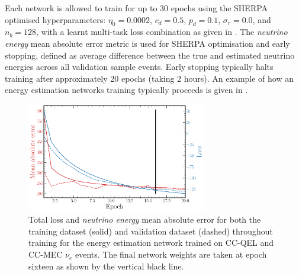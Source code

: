 Each network is allowed to train for up to 30 epochs using the SHERPA optimised hyperparameters:
$\eta_{0}=0.0002$, $c_{d}=0.5$, $p_{d}=0.1$, $\sigma_{r}=0.0$, and $n_{b}=128$, with a learnt
multi-task loss combination as given in . The \emph{neutrino energy}
mean absolute error metric is used for SHERPA optimisation and early stopping, defined as average
difference between the true and estimated neutrino energies across all validation sample events.
Early stopping typically halts training after approximately 20 epochs (taking 2 hours). An example
of how an energy estimation networks training typically proceeds is given in
.

\begin{figure} %
    \includegraphics[width=0.7\textwidth]{diagrams/7-results/final_energy_history.pdf}
    \caption[Loss and mean absolute error throughout training for the energy estimation network]
    {Total loss and \emph{neutrino energy} mean absolute error for both the training dataset
        (solid) and validation dataset (dashed) throughout training for the energy estimation
        network trained on CC-QEL and CC-MEC $\nu_{e}$ events. The final network weights are taken
        at epoch sixteen as shown by the vertical black line.}
    \label{fig:final_energy_history}
\end{figure}